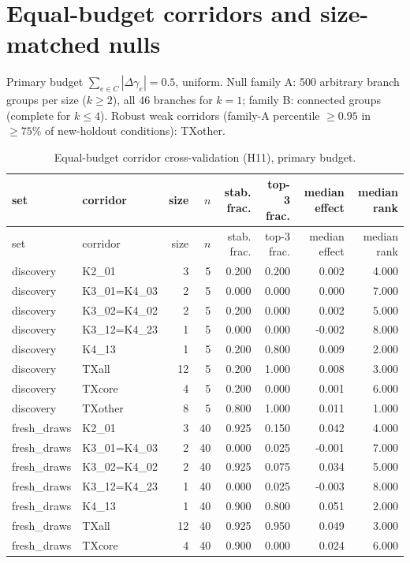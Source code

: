 \documentclass[10pt,a4paper]{article}
\begin{document}
\section{Equal-budget corridors and size-matched nulls}
Primary budget $\sum_{e\in C}|\Delta\gamma_e|=0.5$, uniform. Null family A: 500 arbitrary branch groups per size ($k\ge2$), all 46 branches for $k=1$; family B: connected groups (complete for $k\le4$). Robust weak corridors (family-A percentile $\ge0.95$ in $\ge75\%$ of new-holdout conditions): TXother.

{\tiny
\begin{longtable}{llrrrrrr}
\caption{Equal-budget corridor cross-validation (H11), primary budget.}\label{tab:s-cor}\\
\toprule
set & corridor & size & $n$ & stab. frac. & top-3 frac. & median effect & median rank \\
\midrule
\endfirsthead
\toprule
set & corridor & size & $n$ & stab. frac. & top-3 frac. & median effect & median rank \\
\midrule
\endhead
discovery & K2\_01 & 3 & 5 & 0.200 & 0.200 & 0.002 & 4.000 \\
discovery & K3\_01=K4\_03 & 2 & 5 & 0.000 & 0.000 & 0.000 & 7.000 \\
discovery & K3\_02=K4\_02 & 2 & 5 & 0.200 & 0.000 & 0.002 & 5.000 \\
discovery & K3\_12=K4\_23 & 1 & 5 & 0.000 & 0.000 & -0.002 & 8.000 \\
discovery & K4\_13 & 1 & 5 & 0.200 & 0.800 & 0.009 & 2.000 \\
discovery & TXall & 12 & 5 & 0.200 & 1.000 & 0.008 & 3.000 \\
discovery & TXcore & 4 & 5 & 0.200 & 0.000 & 0.001 & 6.000 \\
discovery & TXother & 8 & 5 & 0.800 & 1.000 & 0.011 & 1.000 \\
fresh\_draws & K2\_01 & 3 & 40 & 0.925 & 0.150 & 0.042 & 4.000 \\
fresh\_draws & K3\_01=K4\_03 & 2 & 40 & 0.000 & 0.025 & -0.001 & 7.000 \\
fresh\_draws & K3\_02=K4\_02 & 2 & 40 & 0.925 & 0.075 & 0.034 & 5.000 \\
fresh\_draws & K3\_12=K4\_23 & 1 & 40 & 0.000 & 0.025 & -0.003 & 8.000 \\
fresh\_draws & K4\_13 & 1 & 40 & 0.900 & 0.800 & 0.051 & 2.000 \\
fresh\_draws & TXall & 12 & 40 & 0.925 & 0.950 & 0.049 & 3.000 \\
fresh\_draws & TXcore & 4 & 40 & 0.900 & 0.000 & 0.024 & 6.000 \\

\end{longtable}}
\end{document}
